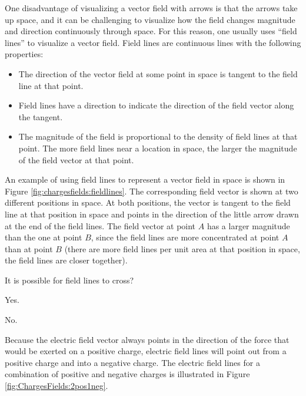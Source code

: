 One disadvantage of visualizing a vector field with arrows is that the arrows take up space, and it can be challenging to visualize how the field changes magnitude and direction continuously through space. For this reason, one usually uses ``field lines'' to visualize a vector field. Field lines are continuous lines with the following properties:
\begin{itemize}
\item The direction of the vector field at some point in space is tangent to the field line at that point.
\item Field lines have a direction to indicate the direction of the field vector along the tangent.
\item The magnitude of the field is proportional to the density of field lines at that point. The more field lines near a location in space, the larger the magnitude of the field vector at that point.
\end{itemize}
An example of using field lines to represent a vector field in space is shown in Figure \ref{fig:chargesfields:fieldlines}. The corresponding field vector is shown at two different positions in space. At both positions, the vector is tangent to the field line at that position in space and points in the direction of the little arrow drawn at the end of the field lines. The field vector at point $A$ has a larger magnitude than the one at point $B$, since the field lines are more concentrated at point $A$ than at point $B$ (there are more field lines per unit area at that position in space, the field lines are closer together).
\begin{checkpoint}\label{cp:chargesfields:efield}
\begin{MCquestion}{It is possible for field lines to cross?}
\item Yes.
\item No. \correct
\end{MCquestion}
\end{checkpoint}
Because the electric field vector always points in the direction of the force that would be exerted on a positive charge, electric field lines will point out from a positive charge and into a negative charge. The electric field lines for a combination of positive and negative charges is illustrated in Figure \ref{fig:ChargesFields:2pos1neg}.


